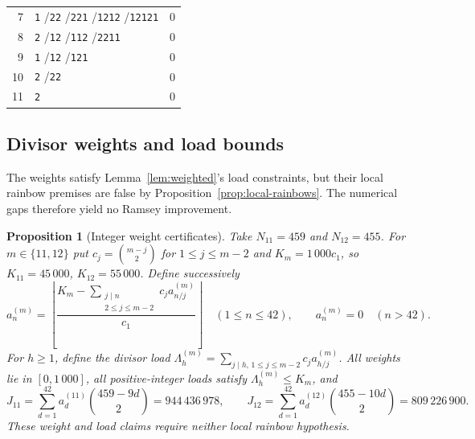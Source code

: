 \documentclass[11pt,a4paper]{article}
\newif\ifshowrevisions
\newcommand{\rev}[1]{{\ifshowrevisions\color{red}\fi #1}}
\newtheorem{proposition}[theorem]{Proposition}
\theoremstyle{definition}
\numberwithin{equation}{section}
\begin{document}
\begin{table}[!htbp]
\begin{tabularx}{\textwidth}{@{}rYr@{}}
		7 & \texttt{1} /\allowbreak \texttt{22} /\allowbreak \texttt{221} /\allowbreak \texttt{1212} /\allowbreak \texttt{12121} & 0 \\
		8 & \texttt{2} /\allowbreak \texttt{12} /\allowbreak \texttt{112} /\allowbreak \texttt{2211} & 0 \\
		9 & \texttt{1} /\allowbreak \texttt{12} /\allowbreak \texttt{121} & 0 \\
		10 & \texttt{2} /\allowbreak \texttt{22} & 0 \\
		11 & \texttt{2} & 0 \\
		\bottomrule\end{tabularx}\end{table}

\FloatBarrier

\subsection{\rev{Divisor weights and load bounds}}\label{app:failed-weights}

The weights satisfy Lemma~\ref{lem:weighted}'s load constraints, but their local rainbow premises are false by Proposition~\ref{prop:local-rainbows}. The numerical gaps therefore yield no Ramsey improvement.

\FloatBarrier
{}
\begin{samepage}
\begin{proposition}[Integer weight certificates]\label{prop:weights}
	Take $N_{11}=459$ and $N_{12}=455$. For $m\in\{11,12\}$ put $c_j=\binom{m-j}2$ for $1\le j\le m-2$ and $K_m=1\,000c_1$, so $K_{11}=45\,000$, $K_{12}=55\,000$. Define successively
	\begin{equation}\label{eq:appendix-result-1}
a_n^{(m)}=\left\lfloor\frac{K_m-\sum_{\substack{j\mid n\\2\le j\le m-2}}c_j a_{n/j}^{(m)}}{c_1}\right\rfloor
	\quad(1\le n\le42),\qquad a_n^{(m)}=0\quad(n>42).
\end{equation}
	For $h\ge1$, define the divisor load $\Lambda_h^{(m)}=\sum_{j\mid h,\,1\le j\le m-2}c_j a_{h/j}^{(m)}$. All weights lie in $[0,1\,000]$, all positive-integer loads satisfy $\Lambda_h^{(m)}\le K_m$, and
	\begin{equation}\label{eq:appendix-result-2}
J_{11}=\sum_{d=1}^{42}a_d^{(11)}\binom{459-9d}2=944\,436\,978,\qquad
	J_{12}=\sum_{d=1}^{42}a_d^{(12)}\binom{455-10d}2=809\,226\,900.
\end{equation}
	These weight and load claims require neither local rainbow hypothesis.
\end{proposition}
\end{samepage}
\end{document}
